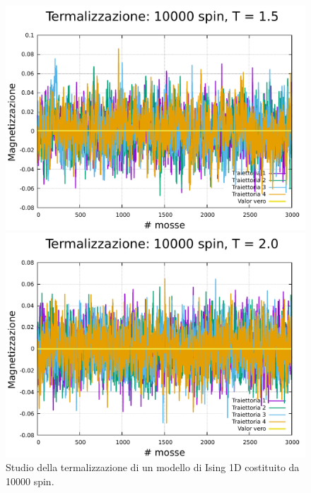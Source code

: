 \begin{figure}[htbp]
    \begin{minipage}{0.45\textwidth}  
      \centering
      \includegraphics[page=1, width=\textwidth]{Immagini/simIsing1D/magn0.0/term/term_10000_1.5.pdf}
      \caption{$T\,=\,1.5$}
    \end{minipage}\hfill
    \begin{minipage}{0.45\textwidth}  
      \centering
      \includegraphics[page=1, width=\textwidth]{Immagini/simIsing1D/magn0.0/term/term_10000_2.0.pdf}
      \caption{$T\,=\,2.0$}
    \end{minipage}
    \caption{Studio della termalizzazione di un modello di Ising 1D costituito da 10000 spin.}
\end{figure}

